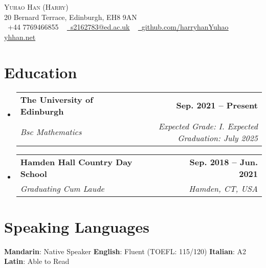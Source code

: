 \documentclass[letterpaper,11pt]{article}
\makeatletter
\newcommand{\resumeSubheading}[4]{
  \vspace{-2pt}\item
    \begin{tabular*}{1.0\textwidth}[t]{l@{\extracolsep{\fill}}r}
      \textbf{#1} & \textbf{\small #2} \\
      \textit{\small#3} & \textit{\small #4} \\
    \end{tabular*}\vspace{-7pt}
}
\newcommand{\resumeSubHeadingListStart}{\begin{itemize}[leftmargin=0.0in, label={}]}
\newcommand{\resumeSubHeadingListEnd}{\end{itemize}}
\makeatother
\begin{document}

\begin{center}
    {\Huge \scshape Yuhao Han (Harry)} \\ \vspace{1pt}
	20 Bernard Terrace, Edinburgh, EH8 9AN
    \\ \vspace{1pt}
    \small \raisebox{-0.1\height}\faPhone\ +44 7769466855 ~ \href{mailto:s2162783@ed.ac.uk}{\raisebox{-0.2\height}\faEnvelope\  \underline{s2162783@ed.ac.uk}} ~ 
    \href{https://github.com/harryhanYuhao}{\raisebox{-0.2\height}\faGithub\ \underline{github.com/harryhanYuhao}} ~
    \href{https://yhhan.net}{\raisebox{-0.2\height}\faChain \underline{yhhan.net}} ~

    \vspace{-8pt}
\end{center}


\section{Education}
  \resumeSubHeadingListStart
    \resumeSubheading
      {The University of Edinburgh}{Sep. 2021 -- Present}
      {Bsc Mathematics}{Expected Grade: I. Expected Graduation: July 2025}
    \resumeSubheading
      {Hamden Hall Country Day School}{Sep. 2018 -- Jun. 2021}
      {Graduating Cum Laude}{Hamden, CT, USA}
  \resumeSubHeadingListEnd

\section{Speaking Languages}
\begin{multicols}{2}
        \textbf{Mandarin}: Native Speaker \hfill
        \textbf{English}: Fluent (TOEFL: 115/120) \hfill
        \textbf{Italian}: A2 \hfill
        \textbf{Latin}: Able to Read \hfill
 \end{multicols}
\end{document}
